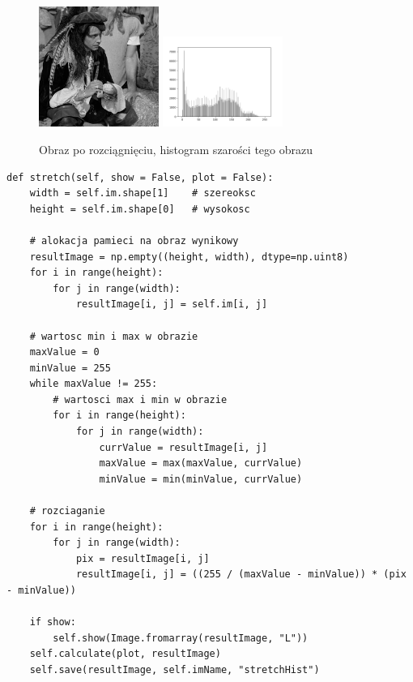 \documentclass[final,a4paper,openany,12pt]{mwbk}
\begin{document}
\begin{figure}[H]
	\begin{center}
		\includegraphics[width=0.35\textwidth]{pirate_gray_stretchHist_result}
		\includegraphics[width=0.35\textwidth]{pirate_gray_stretchHist_histogram}
	\end{center}
	\caption{Obraz po rozciągnięciu, histogram szarości tego obrazu}
\end{figure}


\begin{lstlisting}[caption=Rozciąganie histogramu]
def stretch(self, show = False, plot = False):
	width = self.im.shape[1]    # szereoksc
	height = self.im.shape[0]   # wysokosc
	
	# alokacja pamieci na obraz wynikowy
	resultImage = np.empty((height, width), dtype=np.uint8)
	for i in range(height):
		for j in range(width):
			resultImage[i, j] = self.im[i, j]
	
	# wartosc min i max w obrazie
	maxValue = 0
	minValue = 255
	while maxValue != 255:
		# wartosci max i min w obrazie
		for i in range(height):
			for j in range(width):
				currValue = resultImage[i, j]
				maxValue = max(maxValue, currValue)
				minValue = min(minValue, currValue)
	
	# rozciaganie
	for i in range(height):
		for j in range(width):
			pix = resultImage[i, j]
			resultImage[i, j] = ((255 / (maxValue - minValue)) * (pix - minValue))
	
	if show:
		self.show(Image.fromarray(resultImage, "L"))
	self.calculate(plot, resultImage)
	self.save(resultImage, self.imName, "stretchHist")
\end{lstlisting}
\end{document}
